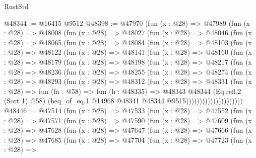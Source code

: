 \begin{lexlean}{RustStd}
\begin{coremodule}
@48344 := @16415 @9512
@48398 := @47970
    (fun (x : @28) =>
    @47989
      (fun (x : @28) =>
      @48008
        (fun (x : @28) =>
        @48027
          (fun (x : @28) =>
          @48046
            (fun (x : @28) =>
            @48065
              (fun (x : @28) =>
              @48084
                (fun (x : @28) =>
                @48103
                  (fun (x : @28) =>
                  @48122
                    (fun (x : @28) =>
                    @48141
                      (fun (x : @28) =>
                      @48160
                        (fun (x : @28) =>
                        @48179
                          (fun (x : @28) =>
                          @48198
                            (fun (x : @28) =>
                            @48217
                              (fun (x : @28) =>
                              @48236
                                (fun (x : @28) =>
                                @48255
                                  (fun (x : @28) =>
                                  @48274
                                    (fun (x : @28) =>
                                    @48293
                                      (fun (x : @28) =>
                                      @48312
                                        (fun (x : @28) =>
                                        @48331
                                          (fun (x : @28) =>
                                          fun (fn : @58) =>
                                          fun (h : @48335) =>
                                          @48343
                                            @48344
                                            (Eq.refl.{2} (Sort 1) @58)
                                            (heq_of_eq.{1}
                                              @14968
                                              @48341
                                              @48344
                                              @9515)))))))))))))))))))))
@48446 := @47514
    (fun (x : @28) =>
    @47533
      (fun (x : @28) =>
      @47552
        (fun (x : @28) =>
        @47571
          (fun (x : @28) =>
          @47590
            (fun (x : @28) =>
            @47609
              (fun (x : @28) =>
              @47628
                (fun (x : @28) =>
                @47647
                  (fun (x : @28) =>
                  @47666
                    (fun (x : @28) =>
                    @47685
                      (fun (x : @28) =>
                      @47704
                        (fun (x : @28) =>
                        @47723
                          (fun (x : @28) =>

\end{coremodule}
\end{lexlean}

